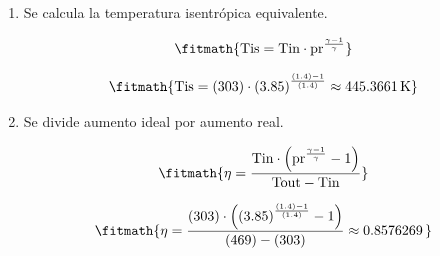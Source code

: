 \begin{enumerate}

\item Se calcula la temperatura isentrópica equivalente.

\[\fitmath{\mathrm{Tis}=\mathrm{Tin}\cdot {\mathrm{pr}}^{\frac{\gamma-1}{\gamma}}}\]

\[\fitmath{\mathrm{Tis}=(303)\cdot {(3.85)}^{\frac{(1.4)-1}{(1.4)}}\approx 445.3661\,\mathrm{K}}\]

\item Se divide aumento ideal por aumento real.

\[\fitmath{\eta=\frac{\mathrm{Tin}\cdot \left({\mathrm{pr}}^{\frac{\gamma-1}{\gamma}}-1\right)}{\mathrm{Tout}-\mathrm{Tin}}}\]

\[\fitmath{\eta=\frac{(303)\cdot \left({(3.85)}^{\frac{(1.4)-1}{(1.4)}}-1\right)}{(469)-(303)}\approx 0.8576269\,}\]

\end{enumerate}
